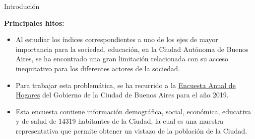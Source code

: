 \documentclass[pdf]{beamer}
\begin{document}
\begin{frame}{Introdución}


\textbf{Principales hitos:} 
    \begin{itemize}
        \justifying
        \item Al estudiar los índices correspondientes a uno de los ejes de mayor importancia para la sociedad, educación, en la Ciudad Autónoma de Buenos Aires, se ha encontrado una gran limitación relacionada con su acceso inequitativo para los diferentes actores de la sociedad. 

        \item Para trabajar esta problemática, se ha recurrido a la \href{https://data.buenosaires.gob.ar/dataset/encuesta-anual-hogares/resource/3a45c563-396d-42de-ba93-8a93729e0723}{Encuesta Anual de Hogares} del Gobierno de la Ciudad de Buenos Aires para el año 2019. 

         \item Esta encuesta contiene información demográfica, social, económica, educativa y de salud de 14319 habitantes de la Ciudad, la cual es una muestra representativa que permite obtener un vistazo de la población de la Ciudad.
         

\end{itemize}
\end{frame}
\end{document}
